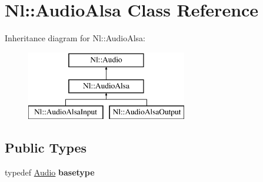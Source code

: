 \hypertarget{classNl_1_1AudioAlsa}{\section{Nl\-:\-:Audio\-Alsa Class Reference}
\label{classNl_1_1AudioAlsa}
}
Inheritance diagram for Nl\-:\-:Audio\-Alsa\-:\begin{figure}[H]
\begin{center}
\leavevmode
\includegraphics[height=3.000000cm]{classNl_1_1AudioAlsa}
\end{center}
\end{figure}
\subsection*{Public Types}
\begin{DoxyCompactItemize}
\item 
\hypertarget{classNl_1_1AudioAlsa_aad72327bf2bb040c59788d54992510fe}{typedef \hyperlink{classNl_1_1Audio}{Audio} {\bfseries basetype}}\label{classNl_1_1AudioAlsa_aad72327bf2bb040c59788d54992510fe}

\end{DoxyCompactItemize}
